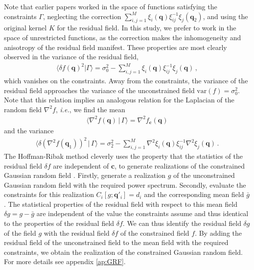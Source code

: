 \documentclass[a4paper, 11pt]{article}
\begin{document}
Note that earlier papers \cite{Bertschinger:1987, Hoffman:1991, Sheth:1995, Weygaert:1996} worked in the space of functions satisfying the constraints $\Gamma$, neglecting the correction $\sum_{i,j=1}^M\xi_i(\bm{q})\xi_{ij}^{-1}\xi_j(\bm{q}_2)$, and using the original kernel $K$ for the residual field. In this study, we prefer to work in the space of unrestricted functions, as the correction makes the inhomogeneity and anisotropy of the residual field manifest. These properties are most clearly observed in the variance of the residual field,
\begin{align}
  \langle \delta f(\bm{q})^2|\Gamma \rangle = \sigma_0^2- \sum_{i,j=1}^M\xi_i(\bm{q})\xi_{ij}^{-1}\xi_j(\bm{q})\,,
  \label{eq:variance_Linear}
\end{align}
which vanishes on the constraints. Away from the constraints, the variance of the residual field approaches the variance of the unconstrained field $\text{var}(f)=\sigma_0^2$. Note that this relation implies an analogous relation for the Laplacian of the random field $\nabla^2 f$, \textit{i.e.}, we find the mean
\begin{align}
\langle \nabla^2 f(\bm{q})\,|\,\Gamma\rangle = \nabla^2 f_{\bm{c}}(\bm{q})
\end{align}
and the variance
\begin{align}
\langle \delta (\nabla^2f(\bm{q}_1))^2\,|\,\Gamma \rangle = \sigma_2^2- \sum_{i,j=1}^M\nabla^2\xi_i(\bm{q})\xi_{ij}^{-1}\nabla^2\xi_j(\bm{q})\,.\label{eq:variance_Linear_Laplace}
\end{align}
\noindent The Hoffman-Ribak method cleverly uses the property that the statistics of the residual field $\delta f$ are independent of $\bm{c}$, to generate realizations of the constrained Gaussian random field \cite{Hoffman:1991, Weygaert:1996}. Firstly, generate a realization $g$ of the unconstrained Gaussian random field with the required power spectrum. Secondly, evaluate the constraints for this realization $C_i[g;\bm{q}'_i]=d_i$ and the corresponding mean field $\bar{g}$. The statistical properties of the residual field with respect to this mean field $\delta g = g-\bar{g}$ are independent of the value the constraints assume and thus identical to the properties of the residual field $\delta f$. We can thus identify the residual field $\delta g$ of the field $g$ with the residual field $\delta f$ of the constrained field $f$. By adding the residual field of the unconstrained field to the mean field with the required constraints, we obtain the realization of the constrained Gaussian random field. For more details see appendix \ref{ap:GRF}.
\end{document}
